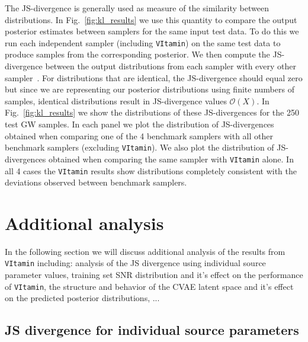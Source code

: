 %
%
The \ac{JS}-divergence is generally used as measure of the similarity
between distributions. In Fig.~\ref{fig:kl_results} we use this quantity to
compare the output posterior estimates between samplers for the same input test
data. To do this we run each independent sampler (including \texttt{VItamin})
on the same test data to produce samples from the corresponding posterior. We
then compute the \ac{JS}-divergence between the output distributions from each
sampler with every other sampler~\cite{4839047}.  For distributions that are
identical, the \ac{JS}-divergence {should} equal zero but since we are
representing our posterior distributions using finite numbers of samples,
identical distributions result in \ac{JS}-divergence values $\mathcal{O}(X)$.
In Fig.~\ref{fig:kl_results} we show the distributions of these
\ac{JS}-divergences for the 250 test \ac{GW} samples. In each panel we plot the
distribution of \ac{JS}-divergences obtained when comparing one of the 4
benchmark samplers with all other benchmark samplers (excluding
\texttt{VItamin}). We also plot the distribution of \ac{JS}-divergences
obtained when comparing the same sampler with \texttt{VItamin} alone. In all 4
cases the \texttt{VItamin} results show distributions completely consistent
with the deviations observed between benchmark samplers. 


\section{Additional analysis}\label{sec:add_analy_vit}

In the following section we will discuss additional analysis of the results 
from \texttt{VItamin} including: analysis of the JS divergence using individual 
source parameter values, training set \ac{SNR} distribution and it's 
effect on the performance of \texttt{VItamin}, the structure and behavior 
of the \ac{CVAE} latent space and it's effect on the predicted 
posterior distributions, ...

\subsection{JS divergence for individual source parameters}
%
%

